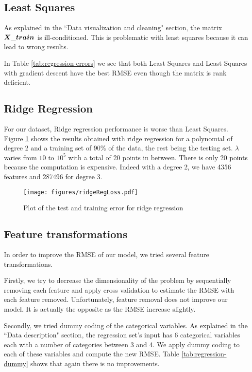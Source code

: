 \documentclass{article} %
\begin{document}
\subsection{Least Squares}
As explained in the ``Data visualization and cleaning" section, the matrix $\boldmath{X\_train}$ is ill-conditioned.
This is problematic with least squares because it can lead to wrong results.

In Table \ref{tab:regression-errors} we see that both Least Squares and Least Squares with gradient descent have the best RMSE even though the matrix is rank deficient.

\subsection{Ridge Regression}

For our dataset, Ridge regression performance is worse than Least Squares.
Figure \ref{fig:ridgeRegError} shows the results obtained with ridge regression for a polynomial of degree 2 and a training set of 90\% of the data, the rest being the testing set. $\lambda$ varies from $10$ to $10^{5}$ with a total of 20 points in between. 
There is only 20 points because the computation is expensive. Indeed with a degree 2, we have 4356 features and 287496 for degree 3.

\begin{figure}[!t]
	\center
	\texttt{[image: figures/ridgeRegLoss.pdf]}
	\caption{Plot of the test and training error for ridge regression}
	\label{fig:ridgeRegError}
\end{figure}


\subsection{Feature transformations}
In order to improve the RMSE of our model, we tried several feature transformations.

Firstly, we try to decrease the dimensionality of the problem by sequentially removing each feature and apply cross validation to estimate the RMSE with each feature removed.
Unfortunately, feature removal does not improve our model. It is actually the opposite as the RMSE increase slightly.

Secondly, we tried dummy coding of the categorical variables.
As explained in the ``Data description" section, the regression set's input has 6 categorical variables each with a number of categories between 3 and 4.
We apply dummy coding to each of these variables and compute the new RMSE.
Table \ref{tab:regression-dummy} shows that again there is no improvements.
\end{document}
